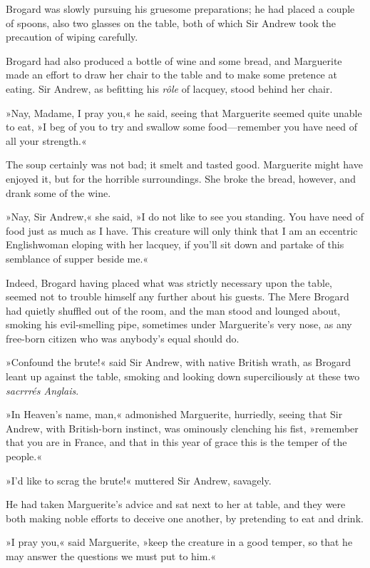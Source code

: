 Brogard was slowly pursuing his gruesome preparations; he had placed a couple of spoons, also two glasses on the table, both of which Sir Andrew took the precaution of wiping carefully.

Brogard had also produced a bottle of wine and some bread, and Marguerite made an effort to draw her chair to the table and to make some pretence at eating. Sir Andrew, as befitting his \textit{rôle} of lacquey, stood behind her chair.

»Nay, Madame, I pray you,« he said, seeing that Marguerite seemed quite unable to eat, »I beg of you to try and swallow some food—remember you have need of all your strength.«

The soup certainly was not bad; it smelt and tasted good. Marguerite might have enjoyed it, but for the horrible surroundings. She broke the bread, however, and drank some of the wine.

»Nay, Sir Andrew,« she said, »I do not like to see you standing. You have need of food just as much as I have. This creature will only think that I am an eccentric Englishwoman eloping with her lacquey, if you'll sit down and partake of this semblance of supper beside me.«

Indeed, Brogard having placed what was strictly necessary upon the table, seemed not to trouble himself any further about his guests. The Mere Brogard had quietly shuffled out of the room, and the man stood and lounged about, smoking his evil-smelling pipe, sometimes under Marguerite's very nose, as any free-born citizen who was anybody's equal should do.

»Confound the brute!« said Sir Andrew, with native British wrath, as Brogard leant up against the table, smoking and looking down superciliously at these two \textit{sacrrrés Anglais}.

»In Heaven's name, man,« admonished Marguerite, hurriedly, seeing that Sir Andrew, with British-born instinct, was ominously clenching his fist, »remember that you are in France, and that in this year of grace this is the temper of the people.«

»I'd like to scrag the brute!« muttered Sir Andrew, savagely.

He had taken Marguerite's advice and sat next to her at table, and they were both making noble efforts to deceive one another, by pretending to eat and drink.

»I pray you,« said Marguerite, »keep the creature in a good temper, so that he may answer the questions we must put to him.«

